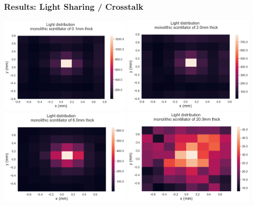 \documentclass[xcolor=x11names, compress, handout]{beamer}
\renewcommand{\(}{\begin{columns}}
\renewcommand{\)}{\end{columns}}
\newcommand{\<}[1]{\begin{column}{#1}}
\renewcommand{\>}{\end{column}}
\begin{document}
\begin{frame}
\frametitle{Results: Light Sharing / Crosstalk }
\includegraphics[width=0.49\textwidth, height=0.4\textheight]{images/hist2d_0p1mm.png}
\includegraphics[width=0.49\textwidth, height=0.4\textheight]{images/hist2d_2mm.png}
\includegraphics[width=0.49\textwidth, height=0.4\textheight]{images/hist2d_6mm.png}
\includegraphics[width=0.49\textwidth, height=0.4\textheight]{images/hist2d_20mm.png}
\end{frame}
\end{document}
